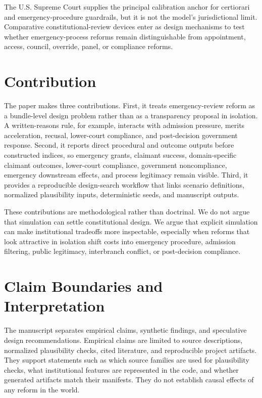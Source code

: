 \documentclass[
    journal=jlc,
    manuscript=research-article,
    year=2026,
  ]{cup-journal}
\begin{document}
The U.S. Supreme Court supplies the principal calibration anchor for certiorari and emergency-procedure guardrails, but it is not the model's jurisdictional limit. Comparative constitutional-review devices enter as design mechanisms to test whether emergency-process reforms remain distinguishable from appointment, access, council, override, panel, or compliance reforms.

\section{Contribution}

The paper makes three contributions. First, it treats emergency-review reform as a bundle-level design problem rather than as a transparency proposal in isolation. A written-reasons rule, for example, interacts with admission pressure, merits acceleration, recusal, lower-court compliance, and post-decision government response. Second, it reports direct procedural and outcome outputs before constructed indices, so emergency grants, claimant success, domain-specific claimant outcomes, lower-court compliance, government noncompliance, emergency downstream effects, and process legitimacy remain visible. Third, it provides a reproducible design-search workflow that links scenario definitions, normalized plausibility inputs, deterministic seeds, and manuscript outputs.

These contributions are methodological rather than doctrinal. We do not argue that simulation can settle constitutional design. We argue that explicit simulation can make institutional tradeoffs more inspectable, especially when reforms that look attractive in isolation shift costs into emergency procedure, admission filtering, public legitimacy, interbranch conflict, or post-decision compliance.

\section{Claim Boundaries and Interpretation}

The manuscript separates empirical claims, synthetic findings, and speculative design recommendations. Empirical claims are limited to source descriptions, normalized plausibility checks, cited literature, and reproducible project artifacts. They support statements such as which source families are used for plausibility checks, what institutional features are represented in the code, and whether generated artifacts match their manifests. They do not establish causal effects of any reform in the world.
\end{document}
